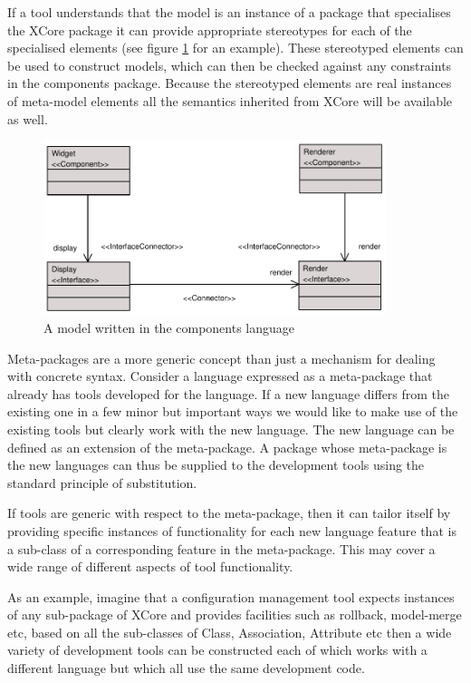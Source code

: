 If a tool understands that the model is an instance of a package
that specialises the XCore package it can provide appropriate
stereotypes for each of the specialised elements (see figure
\ref{amodel} for an example). These stereotyped elements can be
used to construct models, which can then be checked against any
constraints in the components package. Because the stereotyped
elements are real instances of meta-model elements all the
semantics inherited from XCore will be available as well.

\begin{figure}[htb]
\begin{center}
\includegraphics[width=10cm]{LanguageFamilies/figures/amodel}
\caption{A model written in the components language}
\label{amodel}
\end{center}
\end{figure}

Meta-packages are a more generic concept than just a mechanism for
dealing with concrete syntax. Consider a language expressed as a
meta-package that already has tools developed for the language. If
a new language differs from the existing one in a few minor but
important ways we would like to make use of the existing tools but
clearly work with the new language. The new language can be
defined as an extension of the meta-package. A package whose
meta-package is the new languages can thus be supplied to the
development tools using the standard principle of substitution.

If tools are generic with respect to the meta-package, then it can
tailor itself by providing specific instances of functionality for
each new language feature that is a sub-class of a corresponding
feature in the meta-package. This may cover a wide range of
different aspects of tool functionality.

As an example, imagine that a configuration management tool
expects instances of any sub-package of XCore and provides
facilities such as rollback, model-merge etc, based on all the
sub-classes of Class, Association, Attribute etc then a wide
variety of development tools can be constructed each of which
works with a different language but which all use the same
development code.


